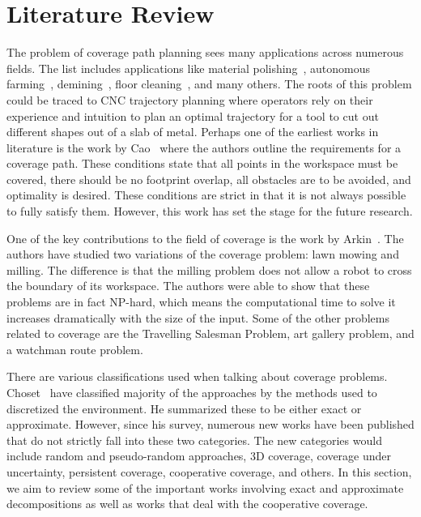 \documentclass[../main.tex]{subfiles}
\begin{document}
\chapter{Literature Review}
\label{chapter:literature_review}

The problem of coverage path planning sees many applications across numerous fields. The list includes applications like material polishing~\cite{rososhansky2010coverage}, autonomous farming~\cite{ollis1997vision}, demining~\cite{acar2003path}, floor cleaning~\cite{yasutomi1988cleaning}, and many others. The roots of this problem could be traced to CNC trajectory planning where operators rely on their experience and intuition to plan an optimal trajectory for a tool to cut out different shapes out of a slab of metal. Perhaps one of the earliest works in literature is the work by Cao~\cite{cao1988region} where the authors outline the requirements for a coverage path. These conditions state that all points in the workspace must be covered, there should be no footprint overlap, all obstacles are to be avoided, and optimality is desired. These conditions are strict in that it is not always possible to fully satisfy them. However, this work has set the stage for the future research.

One of the key contributions to the field of coverage is the work by Arkin~\cite{arkin2000approximation}. The authors have studied two variations of the coverage problem: lawn mowing and milling. The difference is that the milling problem does not allow a robot to cross the boundary of its workspace. The authors were able to show that these problems are in fact NP-hard, which means the computational time to solve it increases dramatically with the size of the input. Some of the other problems related to coverage are the Travelling Salesman Problem, art gallery problem, and a watchman route problem.

There are various classifications used when talking about coverage problems. Choset~\cite{choset2000coverage} have classified majority of the approaches by the methods used to discretized the environment. He summarized these to be either exact or approximate. However, since his survey, numerous new works have been published that do not strictly fall into these two categories. The new categories would include random and pseudo-random approaches, 3D coverage, coverage under uncertainty, persistent coverage, cooperative coverage, and others. In this section, we aim to review some of the important works involving exact and approximate decompositions as well as works that deal with the cooperative coverage.
\end{document}
